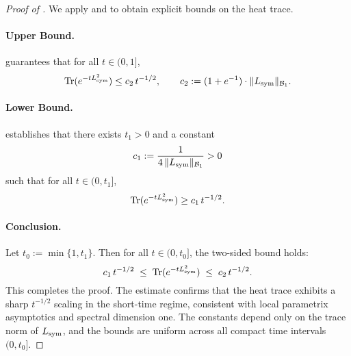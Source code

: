 \begin{proof}[Proof of ]
We apply  and  to obtain explicit bounds on the heat trace.

\paragraph{Upper Bound.}
 guarantees that for all \( t \in (0,1] \),
\[
\operatorname{Tr}(e^{-t L_{\mathrm{sym}}^2}) \leq c_2 \, t^{-1/2}, \qquad
c_2 := (1 + e^{-1}) \cdot \| L_{\mathrm{sym}} \|_{\mathcal{B}_1}.
\]

\paragraph{Lower Bound.}
 establishes that there exists \( t_1 > 0 \) and a constant
\[
c_1 := \frac{1}{4 \, \| L_{\mathrm{sym}} \|_{\mathcal{B}_1}} > 0
\]
such that for all \( t \in (0, t_1] \),
\[
\operatorname{Tr}(e^{-t L_{\mathrm{sym}}^2}) \geq c_1 \, t^{-1/2}.
\]

\paragraph{Conclusion.}
Let \( t_0 := \min\{1, t_1\} \). Then for all \( t \in (0, t_0] \), the two-sided bound holds:
\[
c_1 \, t^{-1/2} \;\leq\; \operatorname{Tr}(e^{-t L_{\mathrm{sym}}^2}) \;\leq\; c_2 \, t^{-1/2}.
\]
This completes the proof. The estimate confirms that the heat trace exhibits a sharp \( t^{-1/2} \) scaling in the short-time regime, consistent with local parametrix asymptotics and spectral dimension one. The constants depend only on the trace norm of \( L_{\mathrm{sym}} \), and the bounds are uniform across all compact time intervals \( (0, t_0] \).
\end{proof}
